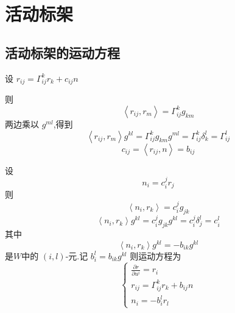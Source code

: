 \documentclass[../../古典微分几何.tex]{subfiles}
\begin{document}
\chapter{活动标架}

\section{活动标架的运动方程}

设 \(  r_{ij}=  \Gamma _{ij}^{k}r_{k}+ c_{ij}n  \) 

则 \[
\left<r_{ij},r_{m} \right>=  \Gamma _{ij}^{k}g_{km}
\]两边乘以 \(  g^{ml}  \),得到 \[
\left<r_{ij},r_{m} \right>g^{kl}=  \Gamma _{ij}^{k}g_{km}g^{ml}=  \Gamma _{ij}^{k} \delta  _{k}^{l}=  \Gamma _{ij}^{l}
\]  \[
c_{ij}= \left<r_{ij},n \right>= b_{ij}
\]

设 \[
n_{i}= c_{i}^{j}r_{j}
\]则 \[
\left<n_{i},r_{k} \right>= c_{i}^{j}g_{jk}
\] \[
\left<n_{i},r_{k} \right>g^{kl}= c_{i}^{j}g_{jk}g^{kl}= c_{i}^{j} \delta  _{j}^{l}= c_{i}^{l}
\]其中 \[
\left<n_{i},r_{k} \right>g^{kl}= -b_{ik}g^{kl}
\]是\(  W  \)中的 \(  \left( i,l \right)   \)-元.记 \(  b_{i}^{l}= b_{ik}g^{kl}  \)   则运动方程为 \[
\begin{cases} \frac{\partial r}{\partial u^{i}}= r_{i}\\ 
 r_{ij}=  \Gamma _{ij}^{k}r_{k}+ b_{ij}n\\ 
  n_{i}= -b_{i}^{l}r_{l} \end{cases} 
\]
\end{document}

